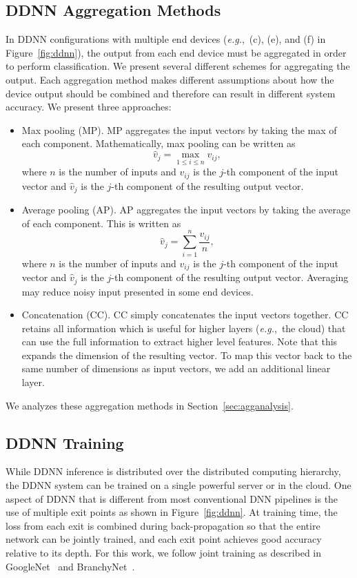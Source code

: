 \documentclass[10pt, conference, compsocconf]{IEEEtran}
\newcommand{\eg}{\emph{e.g.}}
\begin{document}
\subsection{DDNN Aggregation Methods}
\label{sec:agg}
In DDNN configurations with multiple end devices (\eg,~(c), (e), and (f) in Figure~\ref{fig:ddnn}), the output from each end device must be aggregated in order to perform classification. We present several different schemes for aggregating the output. Each aggregation method makes different assumptions about how the device output should be combined and therefore can result in different system accuracy. We present three approaches:
\begin{itemize}
    \item Max pooling (MP). MP aggregates the input vectors by taking the max of each component. Mathematically, max pooling can be written as 
    $$ {\hat v}_{j} = \max_{1 \leq i \leq n} v_{ij}, $$
    where $n$ is the number of inputs and $v_{ij}$ is the $j$-th component of the input vector and ${\hat v}_{j}$ is the $j$-th component of the resulting output vector.
    \item Average pooling (AP). AP aggregates the input vectors by taking the average of each component. This is written as
    $$ {\hat v}_{j} = \sum_{i=1}^n \frac{v_{ij}}{n}, $$
    where $n$ is the number of inputs and $v_{ij}$ is the $j$-th component of the input vector and ${\hat v}_{j}$ is the $j$-th component of the resulting output vector. Averaging may reduce noisy input presented in some end devices.  
    \item Concatenation (CC). CC simply concatenates the input vectors together. CC retains all information which is useful for higher layers (\eg,~the cloud) that can use the full information to extract higher level features. Note that this expands the dimension of the resulting vector. To map this vector back to the same number of dimensions as input vectors, we add an additional linear layer.
\end{itemize}

We analyzes these aggregation methods in Section~\ref{sec:agganalysis}.

\subsection{DDNN Training}
\label{sec:training}
While DDNN inference is distributed over the distributed computing hierarchy, the DDNN system can be trained on a single powerful server or in the cloud. One aspect of DDNN that is different from most conventional DNN pipelines is the use of multiple exit points as shown in Figure~\ref{fig:ddnn}. At training time, the loss from each exit is combined during back-propagation so that the entire network can be jointly trained, and each exit point achieves good accuracy relative to its depth. For this work, we follow joint training as described in GoogleNet~\cite{szegedy2015going} and BranchyNet~\cite{teerapittayanon2016branchynet}.
\end{document}
